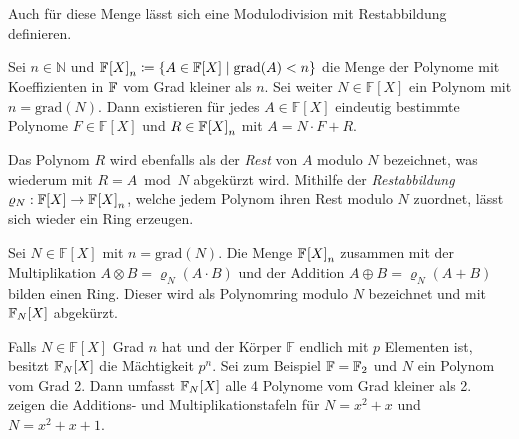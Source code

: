 Auch für diese Menge lässt sich eine Modulodivision mit Restabbildung definieren. 

\begin{satz}
    Sei $n\in \mathbb{N}$ und $\field{} {[X]}_n \coloneqq \{A \in \mathbb{F} {[X]} \mid \mathrm{grad}(A) < n\}$ die Menge der Polynome mit Koeffizienten in $\field{}$ vom Grad kleiner als $n$. Sei weiter $N \in \mathbb{F} {[X]}$ ein Polynom mit $n = \mathrm{grad}(N)$. Dann existieren für jedes $A \in \mathbb{F} {[X]}$ eindeutig bestimmte Polynome $F \in \mathbb{F} {[X]}$ und $R \in \field{} {[X]}_n$ mit $A = N \cdot F + R$.
\end{satz}


Das Polynom $R$ wird ebenfalls als der \emph{Rest} von $A$ modulo $N$ bezeichnet, was wiederum mit $R = A \bmod N$ abgekürzt wird. Mithilfe der \emph{Restabbildung} $\varrho_N : \mathbb{F} {[X]} \rightarrow \field{} {[X]}_n$, welche jedem Polynom ihren Rest modulo $N$ zuordnet, lässt sich wieder ein Ring erzeugen.

\begin{satz}
    Sei $N \in \mathbb{F} {[X]}$ mit $n = \mathrm{grad}(N)$. Die Menge $\field{} {[X]}_n$ zusammen mit der Multiplikation $A \otimes B = \varrho_N(A \cdot B)$ und der Addition $A \oplus B = \varrho_N(A + B)$ bilden einen Ring. Dieser wird als Polynomring modulo $N$ bezeichnet und mit $\field{N} {[X]}$ abgekürzt.
\end{satz}

Falls $N \in \mathbb{F} {[X]}$ Grad $n$ hat und der Körper $\mathbb{F}$ endlich mit $p$ Elementen ist, besitzt $\field{N} {[X]}$ die Mächtigkeit $p^n$.
Sei zum Beispiel $\mathbb{F} = \field{2}$ und $N$ ein Polynom vom Grad 2. Dann umfasst $\field{N} {[X]}$ alle 4 Polynome vom Grad kleiner als 2.  zeigen die Additions- und Multiplikationstafeln für $N=x^2 + x$ und $N= x^2 + x + 1$.

